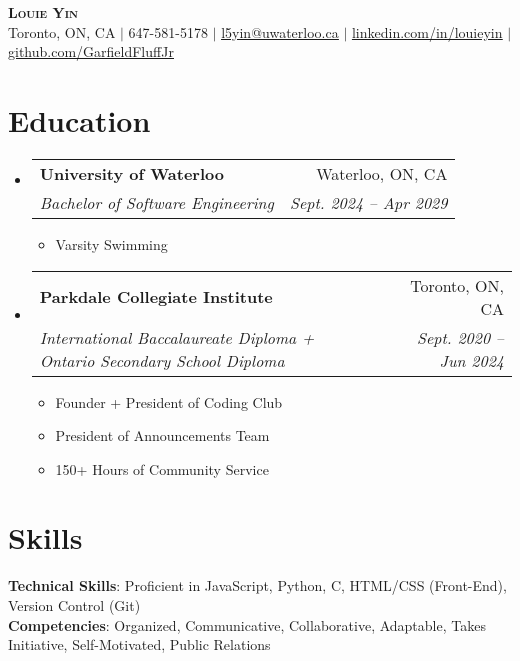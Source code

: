 \documentclass[letterpaper,11pt]{article}
\makeatletter
\newcommand{\resumeItem}[1]{
  \item\small{
    {#1 \vspace{-2pt}}
  }
}
\newcommand{\resumeSubheading}[4]{
  \vspace{-2pt}\item
    \begin{tabular*}{0.97\textwidth}[t]{l@{\extracolsep{\fill}}r}
      \textbf{#1} & #2 \\
      \textit{\small#3} & \textit{\small #4} \\
    \end{tabular*}\vspace{-7pt}
}
\newcommand{\resumeSubHeadingListStart}{\begin{itemize}[leftmargin=0.15in, label={}]}
\newcommand{\resumeSubHeadingListEnd}{\end{itemize}}
\newcommand{\resumeItemListStart}{\begin{itemize}}
\newcommand{\resumeItemListEnd}{\end{itemize}\vspace{-8pt}}
\makeatother
\begin{document}

\begin{center}
    \textbf{\Huge \scshape Louie Yin} \\ \vspace{3pt}
    \small Toronto, ON, CA $|$
    \small 647-581-5178 $|$ \href{mailto:l5yin@uwaterloo.ca}{\underline{l5yin@uwaterloo.ca}} $|$ 
    \href{https://www.linkedin.com/in/louieyin/}{\underline{linkedin.com/in/louieyin}} $|$
    \href{https://github.com/GarfieldFluffJr}{\underline{github.com/GarfieldFluffJr}}
\end{center}


\section{Education}
  \resumeSubHeadingListStart
    \resumeSubheading
      {University of Waterloo}{Waterloo, ON, CA}
      {Bachelor of Software Engineering}{Sept. 2024 -- Apr 2029}
      \resumeItemListStart
        \resumeItem{Varsity Swimming}
      \resumeItemListEnd
    \resumeSubheading
      {Parkdale Collegiate Institute}{Toronto, ON, CA}
      {International Baccalaureate Diploma + Ontario Secondary School Diploma}{Sept. 2020 -- Jun 2024}
    \resumeItemListStart
      \resumeItem{Founder + President of Coding Club}
      \resumeItem{President of Announcements Team}
      \resumeItem{150+ Hours of Community Service}
    \resumeItemListEnd
  \resumeSubHeadingListEnd


\section{Skills}
 \begin{itemize}[leftmargin=0.15in, label={}]
    \small{\item{
     \textbf{Technical Skills}{: Proficient in JavaScript, Python, C, HTML/CSS (Front-End), Version Control (Git)} \\
     \textbf{Competencies}{: Organized, Communicative, Collaborative, Adaptable, Takes Initiative, Self-Motivated, Public Relations}
    }}
 \end{itemize}
\end{document}
